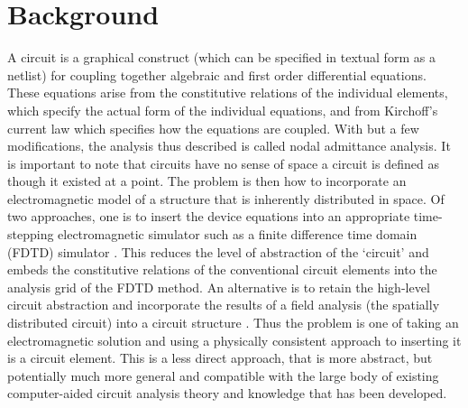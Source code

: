 \section{Background}

A circuit is a graphical construct (which can be specified in textual
form as a netlist) for coupling together algebraic and first order
differential equations. These equations arise from the constitutive
relations of the individual elements, which specify the actual form of
the individual equations, and from Kirchoff's current law which
specifies how the equations are coupled. With but a few modifications,
the analysis thus described is called nodal admittance analysis. It is
important to note that circuits have no sense of space a circuit is
defined as though it existed at a point. The problem is then how to
incorporate an electromagnetic model of a structure that is inherently
distributed in space. Of two approaches, one is to insert the device
equations into an appropriate time-stepping electromagnetic simulator
such as a finite difference time domain (FDTD) simulator
\cite{imtiaz,kuo}. This reduces the level of abstraction of the
`circuit' and embeds the constitutive relations of the conventional
circuit elements into the analysis grid of the FDTD method. An
alternative is to retain the high-level circuit abstraction and
incorporate the results of a field analysis (the spatially distributed
circuit) into a circuit structure
\cite{larique,todd1,antenna,kunisch}. Thus the problem is one of
taking an electromagnetic solution and using a physically consistent
approach to inserting it is a circuit element. This is a less direct
approach, that is more abstract, but potentially much more general and
compatible with the large body of existing computer-aided circuit
analysis theory and knowledge that has been developed.

